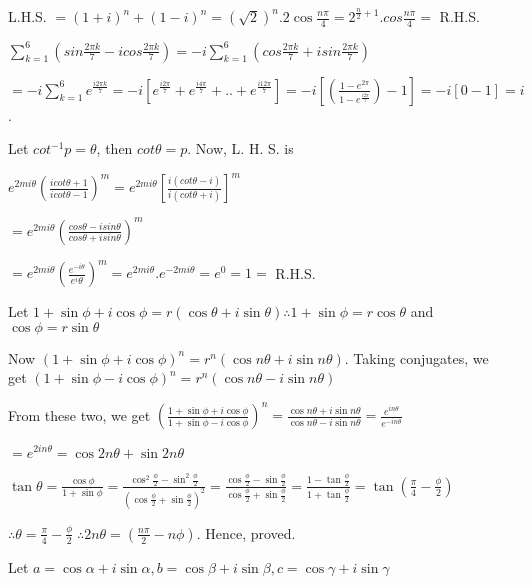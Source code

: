   L.H.S. $= (1 + i)^n + (1 - i)^n = (\sqrt{2})^n.2\cos\frac{n\pi}{4} = 2^{\frac{n}{2} + 1}.cos\frac{n\pi}{4}
  =$ R.H.S.
\item $\displaystyle\sum_{k = 1}^6\left(sin\frac{2\pi k}{7} -icos\frac{2\pi k}{7}\right) = -i \sum_{k =
  1}^6\left(cos\frac{2\pi k}{7} + isin\frac{2\pi k}{7}\right)$

  $= -i \sum_{k = 1}^6 e^{\frac{i2\pi k}{7}} = -i \left[e^{\frac{i2\pi}{7}} + e^{\frac{i4\pi}{7}} + .. +
  e^{\frac{i12\pi}{7}}\right] = -i \left[\left(\frac{1 - e^{2\pi}}{1 - e^{\frac{i2\pi}{7}}}\right) -
  1\right] = -i [0 - 1] = i$.
\item Let $cot^{-1}p = \theta$, then $cot\theta = p$. Now, L. H. S. is

  $e^{2mi\theta}\left(\frac{icot\theta + 1}{icot\theta - 1}\right)^m  = e^{2mi\theta}\left[\frac{i(cot\theta
    - i)}{i(cot\theta + i)}\right]^m$

  $= e^{2mi\theta}\left(\frac{cos\theta - isin\theta}{cos\theta + isin\theta}\right)^m$

  $= e^{2mi\theta}\left(\frac{e^{-i\theta}}{e^i\theta}\right)^m = e^{2mi\theta} . e^{-2mi\theta} = e^0 = 1
  =$ R.H.S.
\item Let $1 + \sin\phi + i \cos\phi = r(\cos\theta + i \sin\theta) \therefore 1 + \sin\phi = r\cos\theta$
  and $\cos\phi = r\sin\theta$

  Now $(1 + \sin\phi + i \cos\phi)^n = r^n(\cos n\theta + i\sin n\theta)$. Taking conjugates, we get $(1
  + \sin\phi - i \cos\phi)^n = r^n(\cos n\theta - i\sin n\theta)$

  From these two, we get $\left(\frac{1 + \sin\phi + i \cos\phi}{1 + \sin\phi - i \cos\phi}\right)^n =
  \frac{\cos n\theta + i\sin n\theta}{\cos n\theta - i\sin n\theta} = \frac{e^{in\theta}}{e^{-in\theta}}$

  $= e^{2in\theta} = \cos 2n\theta + \sin 2n\theta$

  $\tan \theta = \frac{\cos \phi}{1 + \sin \phi} = \frac{\cos^2\frac{\phi}{2} -
    \sin^2\frac{\phi}{2}}{\left(\cos\frac{\phi}{2} + \sin\frac{\phi}{2}\right)^2} =
  \frac{\cos\frac{\phi}{2} - \sin\frac{\phi}{2}}{\cos\frac{\phi}{2} + \sin\frac{\phi}{2}} = \frac{1 -
    \tan\frac{\phi}{2}}{1 + \tan\frac{\phi}{2}} = \tan\left(\frac{\pi}{4} - \frac{\phi}{2}\right)$

  $\therefore \theta = \frac{\pi}{4} - \frac{\phi}{2}\;\therefore 2n\theta = \left(\frac{n\pi}{2} -
  n\phi\right)$. Hence, proved.
\item Let $a = \cos\alpha + i \sin\alpha, b = \cos\beta + i \sin\beta, c = \cos\gamma + i \sin\gamma$


